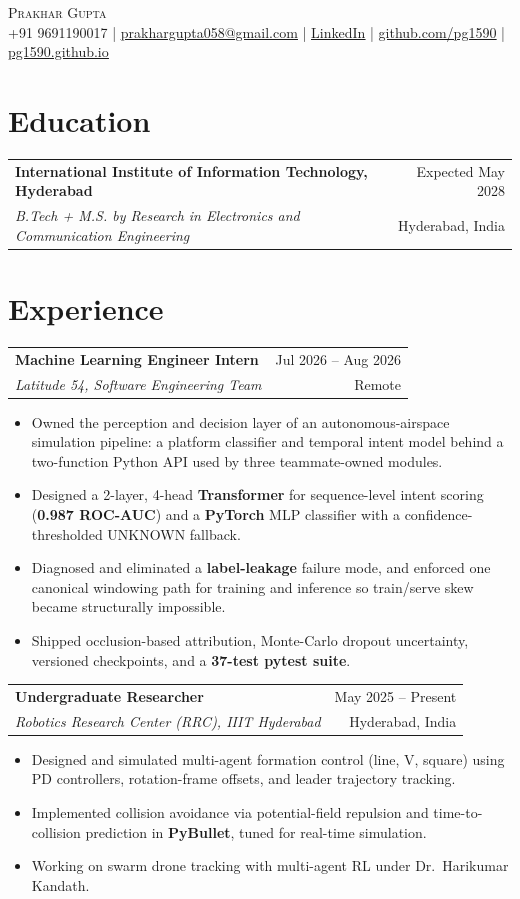 \documentclass[letterpaper,10pt]{article}
\newcommand{\entry}[4]{%
  \begin{tabularx}{\textwidth}{X r}
    \textbf{#1} & #2 \\
    \textit{\small #3} & \small #4 \\
  \end{tabularx}\vspace{-3pt}}
\begin{document}
\begin{center}
  {\LARGE\scshape Prakhar Gupta} \\[3pt]
  \small +91 9691190017 \;|\;
  \href{mailto:prakhargupta058@gmail.com}{\underline{prakhargupta058@gmail.com}} \;|\;
  \href{https://www.linkedin.com/in/prakhar-gupta-199744271/}{\underline{LinkedIn}} \;|\;
  \href{https://github.com/pg1590}{\underline{github.com/pg1590}} \;|\;
  \href{https://pg1590.github.io}{\underline{pg1590.github.io}}
\end{center}
\vspace{-6pt}

\section{Education}
\entry{International Institute of Information Technology, Hyderabad}{Expected May 2028}
  {B.Tech + M.S. by Research in Electronics and Communication Engineering}{Hyderabad, India}

\section{Experience}
\entry{Machine Learning Engineer Intern}{Jul 2026 -- Aug 2026}{Latitude 54, Software Engineering Team}{Remote}
\begin{itemize}
  \item Owned the perception and decision layer of an autonomous-airspace simulation pipeline: a platform classifier and temporal intent model behind a two-function Python API used by three teammate-owned modules.
  \item Designed a 2-layer, 4-head \textbf{Transformer} for sequence-level intent scoring (\textbf{0.987 ROC-AUC}) and a \textbf{PyTorch} MLP classifier with a confidence-thresholded UNKNOWN fallback.
  \item Diagnosed and eliminated a \textbf{label-leakage} failure mode, and enforced one canonical windowing path for training and inference so train/serve skew became structurally impossible.
  \item Shipped occlusion-based attribution, Monte-Carlo dropout uncertainty, versioned checkpoints, and a \textbf{37-test pytest suite}.
\end{itemize}

\entry{Undergraduate Researcher}{May 2025 -- Present}{Robotics Research Center (RRC), IIIT Hyderabad}{Hyderabad, India}
\begin{itemize}
  \item Designed and simulated multi-agent formation control (line, V, square) using PD controllers, rotation-frame offsets, and leader trajectory tracking.
  \item Implemented collision avoidance via potential-field repulsion and time-to-collision prediction in \textbf{PyBullet}, tuned for real-time simulation.
  \item Working on swarm drone tracking with multi-agent RL under Dr.\ Harikumar Kandath.
\end{itemize}
\end{document}
